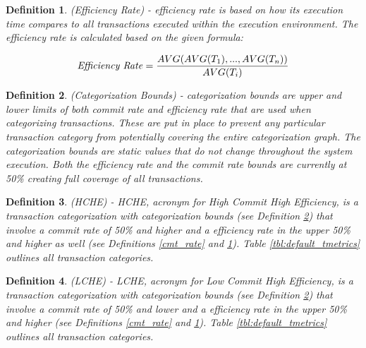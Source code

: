 \documentclass[conference]{IEEEtran}
\newtheorem{definition}{Definition}
\begin{document}
\begin{definition}
\label{eff_rate}
 (Efficiency Rate) - efficiency rate is based on how its execution time compares to all transactions executed within the execution environment. The efficiency rate is calculated based on the given formula:
 
\[\textrm{\textit{Efficiency Rate}} =\frac{\textrm{$AVG(AVG(T_{1}),...,AVG(T_{n}))$}}{\textrm{$AVG(T_{i})$}}\]
 
\end{definition}

\begin{definition}
\label{cat_bounds}
 (Categorization Bounds) - categorization bounds are upper and lower limits of both commit rate and efficiency rate that are used when categorizing transactions. These are put in place to prevent any particular transaction category from potentially covering the entire categorization graph. The categorization bounds are static values that do not change throughout the system execution. Both the efficiency rate and the commit rate bounds are currently at 50\% creating full coverage of all transactions.
\end{definition}


\begin{definition}
\label{min_commit}
(HCHE) - HCHE, acronym for High Commit High Efficiency, is a transaction categorization with categorization bounds (see Definition \ref{cat_bounds}) that involve a commit rate of 50\% and higher and a efficiency rate in the upper 50\% and higher as well (see Definitions \ref{cmt_rate} and \ref{eff_rate}). Table \ref{tbl:default_tmetrics} outlines all transaction categories.
\end{definition}

\begin{definition}
\label{min_abrt}
(LCHE) - LCHE, acronym for Low Commit High Efficiency, is a transaction categorization with categorization bounds (see Definition \ref{cat_bounds}) that involve a commit rate of 50\% and lower and a efficiency rate in the upper 50\% and higher (see Definitions \ref{cmt_rate} and \ref{eff_rate}). Table \ref{tbl:default_tmetrics} outlines all transaction categories.
\end{definition}
\end{document}
